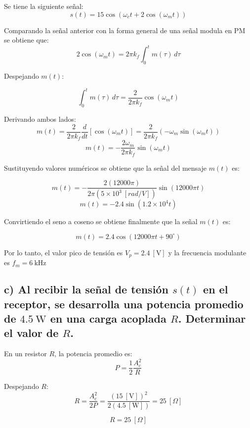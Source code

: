 Se tiene la siguiente señal:
    \[
        s(t) = 15\cos(\omega_c t + 2\cos(\omega_m t))
    \]

Comparando la señal anterior con la forma general de una señal modula en PM se obtiene que:
    \[
        2\cos(\omega_m t) = 2\pi k_f \int_0^t m(\tau)\,d\tau
    \]

Despejando \( m(t) \):

    \[
        \int_0^t m(\tau)\,d\tau = \frac{2}{2\pi k_f}\cos(\omega_m t)
    \]

Derivando ambos lados:
    \[
        m(t) = \frac{2}{2\pi k_f}\frac{d}{dt}[\cos(\omega_m t)] = \frac{2}{2\pi k_f}(-\omega_m \sin(\omega_m t))
    \]
    \[
        m(t) = -\frac{2\omega_m}{2\pi k_f}\sin(\omega_m t)
    \]

Sustituyendo valores numéricos se obtiene que la señal del mensaje $m(t)$ es:

    \[
        m(t) = -\frac{2(12000\pi)}{2\pi(5\times10^3~[rad/V])}\sin(12000\pi t)
    \]
    \[
        m(t) = -2.4\sin(1.2\times10^4 t)
    \]

Convirtiendo el seno a coseno se obtiene finalmente que la señal $m(t)$ es:

    \[
        m(t) = 2.4\cos(12000\pi t + 90^\circ)
    \]
    
Por lo tanto, el valor pico de tensión es $V_p = 2.4~[\text{V}]$ y la frecuencia modulante es $f_m = 6~\text{kHz}$

\subsection*{c) Al recibir la señal de tensión $s(t)$ en el receptor, se desarrolla una potencia promedio de $4.5~\text{W}$ en una carga acoplada $R$. Determinar el valor de $R$.}

En un resistor \( R \), la potencia promedio es:
    \[
        P = \frac{1}{2}\frac{A_c^2}{R}
    \]

Despejando \( R \):
    \[
        R = \frac{A_c^2}{2P} = \frac{(15~[\text{V}])^2}{2(4.5~[\text{W}])} = 25~[\Omega]
    \]

    \[
        \boxed{R = 25~[\Omega]}
    \]